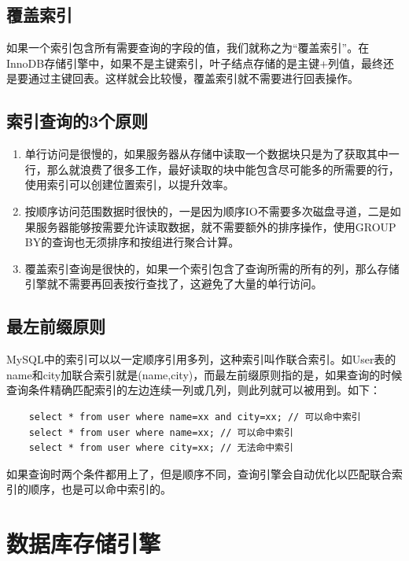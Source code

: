 \documentclass[main.tex]{subfiles}
\begin{document}
\subsection{覆盖索引}
如果一个索引包含所有需要查询的字段的值，我们就称之为“覆盖索引”。在InnoDB存储引擎中，如果不是主键索引，叶子结点存储的是主键+列值，最终还是要通过主键回表。这样就会比较慢，覆盖索引就不需要进行回表操作。

\subsection{索引查询的3个原则}
\begin{enumerate}
    \item 单行访问是很慢的，如果服务器从存储中读取一个数据块只是为了获取其中一行，那么就浪费了很多工作，最好读取的块中能包含尽可能多的所需要的行，使用索引可以创建位置索引，以提升效率。
    \item 按顺序访问范围数据时很快的，一是因为顺序IO不需要多次磁盘寻道，二是如果服务器能够按需要允许读取数据，就不需要额外的排序操作，使用GROUP BY的查询也无须排序和按组进行聚合计算。
    \item 覆盖索引查询是很快的，如果一个索引包含了查询所需的所有的列，那么存储引擎就不需要再回表按行查找了，这避免了大量的单行访问。
\end{enumerate}

\subsection{最左前缀原则}
MySQL中的索引可以以一定顺序引用多列，这种索引叫作联合索引。如User表的name和city加联合索引就是(name,city)，而最左前缀原则指的是，如果查询的时候查询条件精确匹配索引的左边连续一列或几列，则此列就可以被用到。如下：
\begin{verbatim}
    select * from user where name=xx and city=xx; // 可以命中索引
    select * from user where name=xx; // 可以命中索引
    select * from user where city=xx; // 无法命中索引
\end{verbatim}
如果查询时两个条件都用上了，但是顺序不同，查询引擎会自动优化以匹配联合索引的顺序，也是可以命中索引的。

\section{数据库存储引擎}
\end{document}
